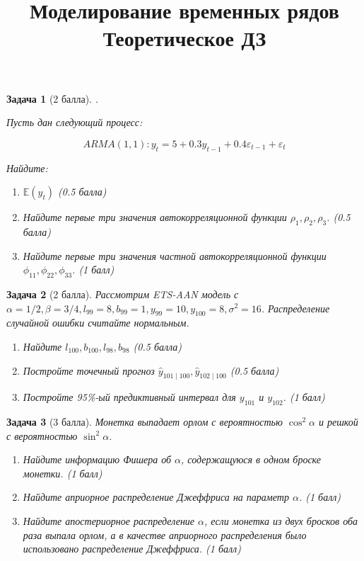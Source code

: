 \documentclass[11pt,fleqn]{article}
\def \mbb{\mathbb}
\def \E{\mbb{E}}
\newtheorem{esProblem}{Задача}
\begin{document}
\title{Моделирование временных рядов\\Теоретическое ДЗ}
\date{}
\author{}
\maketitle

\begin{esProblem}[2 балла]
	.
	
	Пусть дан следующий процесс: 
	
	$$ ARMA(1,1): y_{t}=5+0.3 y_{t-1}+0.4 \varepsilon_{t-1}+\varepsilon_{t} $$
	
	Найдите:
	\begin{enumerate}
	\item 	$\E(y_t)$ (0.5 балла)
	\item Найдите первые три значения автокорреляционной функции $\rho_{1}, \rho_{2}, \rho_{3}$. (0.5 балла)
	\item Найдите первые три значения частной автокорреляционной функции $\phi_{11}, \phi_{22}, \phi_{33}$. (1 балл)
\end{enumerate}
\end{esProblem}

\begin{esProblem}[2 балла]
	Рассмотрим ETS-AAN модель с $\alpha=1 / 2, \beta=3 / 4, l_{99}=8, b_{99}=1, y_{99}=10, y_{100}=8, \sigma^{2}=16$. Распределение случайной ошибки считайте нормальным.
	
	\begin{enumerate}
		\item Найдите $l_{100}, b_{100}, l_{98}, b_{98}$ (0.5 балла)
		\item Постройте точечный прогноз $\hat{y}_{101 \mid 100}, \hat{y}_{102 \mid 100}$ (0.5 балла)
		\item  Постройте 95\%-ый предиктивный интервал для $y_{101}$ и $y_{102}$. (1 балл)
	\end{enumerate}
\end{esProblem}

\begin{esProblem}[3 балла] Монетка выпадает орлом с вероятностью $\cos^2 \alpha$ и решкой с вероятностью $\sin^2 \alpha$. 

\begin{enumerate}
	\item Найдите информацию Фишера об $\alpha$, содержащуюся в одном броске монетки. (1 балл)
	\item Найдите априорное распределение Джеффриса на параметр $\alpha$. (1 балл)
	\item Найдите апостериорное распределение $\alpha$, если монетка из двух бросков оба раза выпала орлом, а 
	в качестве априорного распределения было использовано распределение Джеффриса. (1 балл)
\end{enumerate}
\end{esProblem}
\end{document}
